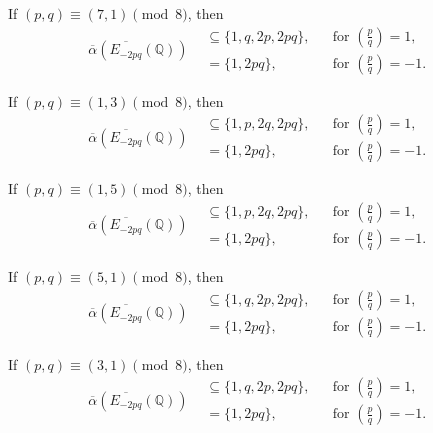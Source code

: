 \documentclass[10pt,a4paper]{amsart}
\newcommand{\bbQ}{\mathbb{Q}}
\newcommand{\legendre}[2]{\genfrac{(}{)}{}{}{#1}{#2}}
\begin{document}
\begin{lem}
\label{lem:oalpha_1.3} 
If $(p,q)\equiv (7,1)\pmod 8$, then
\[
\overline{\alpha}\left(\overline{E_{-2pq}}(\bbQ)\right)
\begin{aligned}
&\subseteq \{1,q,2p,2pq\},
&& \text{for } \legendre{p}{q}=1,\\
&= \{1,2pq\},
&& \text{for } \legendre{p}{q}=-1.
\end{aligned}
\]
\end{lem}

\begin{lem}
\label{lem:oalpha_2.1}
If $(p,q)\equiv (1,3)\pmod 8$, then
\[
\overline{\alpha}\left(\overline{E_{-2pq}}(\bbQ)\right)
\begin{aligned}
&\subseteq \{1,p,2q,2pq\},
&& \text{for } \legendre{p}{q}=1,\\
&= \{1,2pq\},
&& \text{for } \legendre{p}{q}=-1.
\end{aligned}
\]
\end{lem}

\begin{lem}
\label{lem:oalpha_2.2}
If $(p,q)\equiv (1,5)\pmod 8$, then
\[
\overline{\alpha}\left(\overline{E_{-2pq}}(\bbQ)\right)
\begin{aligned}
&\subseteq \{1,p,2q,2pq\},
&& \text{for } \legendre{p}{q}=1,\\
&= \{1,2pq\},
&& \text{for } \legendre{p}{q}=-1.
\end{aligned}
\]
\end{lem}

\begin{lem}
\label{lem:oalpha_3.3}
If $(p,q)\equiv (5,1)\pmod 8$, then
\[
\overline{\alpha}\left(\overline{E_{-2pq}}(\bbQ)\right)
\begin{aligned}
&\subseteq \{1,q,2p,2pq\},
&& \text{for } \legendre{p}{q}=1,\\
&= \{1,2pq\},
&& \text{for } \legendre{p}{q}=-1.
\end{aligned}
\]
\end{lem}

\begin{lem}
\label{lem:oalpha_3.1}
If $(p,q)\equiv (3,1)\pmod 8$, then
\[
\overline{\alpha}\left(\overline{E_{-2pq}}(\bbQ)\right)
\begin{aligned}
&\subseteq \{1,q,2p,2pq\},
&& \text{for } \legendre{p}{q}=1,\\
&= \{1,2pq\},
&& \text{for } \legendre{p}{q}=-1.
\end{aligned}
\]
\end{lem}
\end{document}
